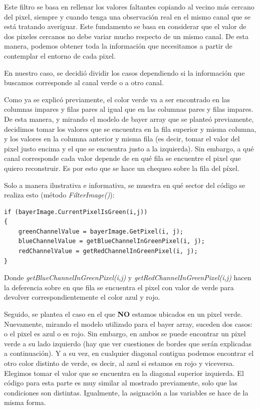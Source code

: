 Este filtro se basa en rellenar los valores faltantes copiando al vecino más
cercano del pixel, siempre y cuando tenga una observación real en el mismo canal que se está tratando averiguar. Este fundamento se basa en considerar que el valor de dos pixeles cercanos no debe variar mucho respecto de un mismo canal. De esta manera, podemos obtener toda la información que necesitamos a partir de contemplar el entorno de cada pixel.
\par 
En nuestro caso, se decidió dividir los casos dependiendo si la información que buscamos corresponde al canal verde o a otro canal.
\par 
Como ya se explicó previamente, el color verde va a ser encontrado en las columnas impares y filas pares al igual que en las columnas pares y filas impares. De esta manera, y mirando el modelo de bayer array que se planteó previamente, decidimos tomar los valores que se encuentra en la fila superior y misma columna, y los valores en la columna anterior y misma fila (es decir, tomar el valor del pixel justo encima y el que se encuentra justo a la izquierda). Sin embargo, a qué canal corresponde cada valor depende de en qué fila se encuentre el pixel que quiero reconstruir. Es por esto que se hace un chequeo sobre la fila del píxel.
\par 
Solo a manera ilustrativa e informativa, se muestra en qué sector del código se realiza esto (método \textit{FilterImage()}): 
\begin{lstlisting}
if (bayerImage.CurrentPixelIsGreen(i,j))
{
	greenChannelValue = bayerImage.GetPixel(i, j);
	blueChannelValue = getBlueChannelInGreenPixel(i, j);
	redChannelValue = getRedChannelInGreenPixel(i, j);
}
\end{lstlisting}
\par 
Donde \textit{getBlueChannelInGreenPixel(i,j)} y \textit{getRedChannelInGreenPixel(i,j)} hacen la deferencia sobre en que fila se encuentra el pixel con valor de verde para devolver correspondientemente el color azul y rojo.
\par
Seguido, se plantea el caso en el que \textbf{NO} estamos ubicados en un pixel verde. Nuevamente, mirando el modelo utilizado para el bayer array, suceden dos casos: o el pixel es azul o es rojo. Sin embargo, en ambos se puede encontrar un pixel verde a su lado izquierdo (hay que ver cuestiones de bordes que serán explicadas a continuación). Y a su vez, en cualquier diagonal contigua podemos encontrar el otro color distinto de verde, es decir, al azul si estamos en rojo y viceversa. Elegimos tomar el valor que se encuentra en la diagonal superior izquierda. El código para esta parte es muy similar al mostrado previamente, solo que las condiciones son distintas. Igualmente, la asignación a las variables se hace de la misma forma.
